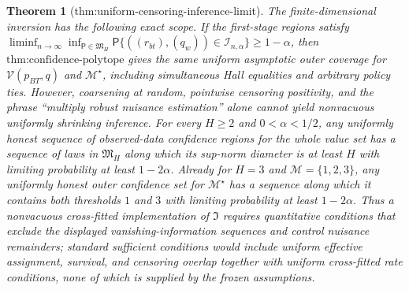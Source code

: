 \documentclass{article}
\newtheorem{theorem}{Theorem}
\begin{document}
\begin{theorem}[thm:uniform-censoring-inference-limit]\label{thm:uniform-censoring-inference-limit}
The finite-dimensional inversion has the following exact scope.  If the first-stage regions satisfy \(\liminf_{n\to\infty}\inf_{\mathsf P\in\mathfrak M_H}\mathsf P\{((r_{bt}),(q_w))\in\mathcal I_{n,\alpha}\}\ge1-\alpha\), then \(\text{thm:confidence-polytope}\) gives the same uniform asymptotic outer coverage for \(\mathcal V(p_{BT},q)\) and \(\mathcal M^\star\), including simultaneous Hall equalities and arbitrary policy ties.  However, coarsening at random, pointwise censoring positivity, and the phrase ``multiply robust nuisance estimation'' alone cannot yield nonvacuous uniformly shrinking inference.  For every \(H\ge2\) and \(0<\alpha<1/2\), any uniformly honest sequence of observed-data confidence regions for the whole value set has a sequence of laws in \(\mathfrak M_H\) along which its sup-norm diameter is at least \(H\) with limiting probability at least \(1-2\alpha\).  Already for \(H=3\) and \(\mathcal M=\{1,2,3\}\), any uniformly honest outer confidence set for \(\mathcal M^\star\) has a sequence along which it contains both thresholds \(1\) and \(3\) with limiting probability at least \(1-2\alpha\).  Thus a nonvacuous cross-fitted implementation of \(\mathfrak I\) requires quantitative conditions that exclude the displayed vanishing-information sequences and control nuisance remainders; standard sufficient conditions would include uniform effective assignment, survival, and censoring overlap together with uniform cross-fitted rate conditions, none of which is supplied by the frozen assumptions.
\end{theorem}
\end{document}
